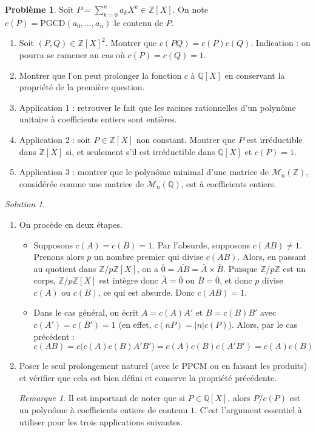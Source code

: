\documentclass[french]{book}
\newcommand{\Z}{\mathbb{Z}}
\newcommand{\Q}{\mathbb{Q}}
\theoremstyle{definition}
\newtheorem{pro}{Problème}[chapter]
\theoremstyle{remark}
\newtheorem*{sol}{Solution}
\newtheorem*{rmq}{Remarque}
\begin{document}
\begin{pro}
	Soit $P=\displaystyle\sum_{k=0}^{n}a_kX^k\in\Z[X]$. On note $c(P)=\text{PGCD}(a_0,\ldots,a_n)$ le contenu de $P$.
	\begin{enumerate}
		\item Soit $(P,Q)\in\Z[X]^2$. Montrer que $c(PQ)=c(P)c(Q)$. Indication : on pourra se ramener au cas où $c(P)=c(Q)=1$.
		\item Montrer que l'on peut prolonger la fonction $c$ à $\Q[X]$ en conservant la propriété de la première question.
		\item Application 1 : retrouver le fait que les racines rationnelles d'un polynôme unitaire à coefficients entiers sont entières.
		\item Application 2 : soit $P\in\Z[X]$ non constant. Montrer que $P$ est irréductible dans $\Z[X]$ si, et seulement s'il est irréductible dans $\Q[X]$ et $c(P)=1$.
		\item Application 3 : montrer que le polynôme minimal d'une matrice de $\mathcal{M}_n(\Z)$, considérée comme une matrice de $\mathcal{M}_n(\Q)$, est à coefficients entiers.
	\end{enumerate}
\end{pro}
\begin{sol}
	\begin{enumerate}
		\item On procède en deux étapes.
		\begin{itemize}
			\item Supposons $c(A)=c(B)=1$. Par l'absurde, supposons $c(AB)\ne 1$. Prenons alors $p$ un nombre premier qui divise $c(AB)$. Alors, en passant au quotient dans $\Z/p\Z[X]$, on a $\overline{0}=\overline{AB}=\overline{A}\times\overline{B}$. Puisque $\Z/p\Z$ est un corps, $\Z/p\Z[X]$ est intègre donc $\overline{A}=\overline{0}$ ou $\overline{B}=\overline{0}$, et donc $p$ divise $c(A)$ ou $c(B)$, ce qui est absurde. Donc $c(AB)=1$.
			\item Dans le cas général, on écrit $A=c(A)A'$ et $B=c(B)B'$ avec $c(A')=c(B')=1$ (en effet, $c(nP)=\lvert n\rvert c(P)$). Alors, par le cas précédent : $$c(AB)=c\big(c(A)c(B)A'B'\big)=c(A)c(B)c(A'B')=c(A)c(B)$$
		\end{itemize}
		\item Poser le seul prolongement naturel (avec le PPCM ou en faisant les produits) et vérifier que cela est bien défini et conserve la propriété précédente.
		\begin{rmq}
			Il est important de noter que si $P\in\Q[X]$, alors $P/c(P)$ est un polynôme à coefficients entiers de contenu $1$. C'est l'argument essentiel à utiliser pour les trois applications suivantes.
		\end{rmq}
	\end{enumerate}
\end{sol}
\end{document}
